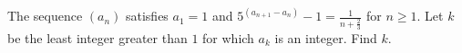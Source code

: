 The sequence $ (a_n)$ satisfies $ a_1 = 1$ and $ \displaystyle 5^{(a_{n+1}-a_n)} - 1 = \frac{1}{n+\frac{2}{3}}$ for $ n \geq 1$. Let $ k$ be the least integer greater than $ 1$ for which $ a_k$ is an integer. Find $ k$.